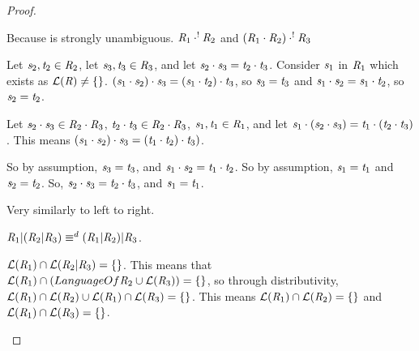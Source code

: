 \documentclass[numbers,10pt,preprint\ifanon ,nocopyrightspace\fi]{sigplanconf}
\begin{document}
\begin{proof}
\begin{case}
    Because \Regex is strongly unambiguous.
    $\mathit{R}_1 \cdot^! \mathit{R}_2$ and
    $(\mathit{R}_1 \cdot \mathit{R}_2) \cdot^! \mathit{R}_3$

    Let $\mathit{s}_2,\mathit{t}_2 \in \mathit{R}_2$, let $\mathit{s}_3,\mathit{t}_3
    \in \mathit{R}_3$, and let
    $\mathit{s}_2 \cdot \mathit{s}_3 = \mathit{t}_2 \cdot \mathit{t}_3$.
    Consider $\mathit{s}_1$ in $\mathit{R}_1$ which exists as
    $\mathcal{L}(\mathit{R}) \neq \{\}$.
    $(\mathit{s}_1 \cdot \mathit{s}_2) \cdot \mathit{s}_3 =
    (\mathit{s}_1 \cdot \mathit{t}_2) \cdot \mathit{t}_3$, so
    $\mathit{s}_3 = \mathit{t}_3$ and
    $\mathit{s}_1 \cdot \mathit{s}_2 = \mathit{s}_1 \cdot \mathit{t}_2$,
    so $\mathit{s}_2 = \mathit{t}_2$.

    Let $\mathit{s}_2 \cdot \mathit{s}_3 \in \mathit{R}_2 \cdot \mathit{R}_3$,
    $\mathit{t}_2 \cdot \mathit{t}_3 \in \mathit{R}_2 \cdot \mathit{R}_3$,
    $\mathit{s}_1,\mathit{t}_1 \in \mathit{R}_1$,
    and let $\mathit{s}_1 \cdot (\mathit{s}_2 \cdot \mathit{s}_3) = 
    \mathit{t}_1 \cdot (\mathit{t}_2 \cdot \mathit{t}_3)$.
    This means $(\mathit{s}_1 \cdot \mathit{s}_2) \cdot \mathit{s}_3 =
    (\mathit{t}_1 \cdot \mathit{t}_2) \cdot \mathit{t}_3)$.
    
    So by assumption, $\mathit{s}_3 = \mathit{t}_3$, and
    $\mathit{s}_1 \cdot \mathit{s}_2 = \mathit{t}_1 \cdot \mathit{t}_2$.
    So by assumption, $\mathit{s}_1 = \mathit{t}_1$ and $\mathit{s}_2 = \mathit{t}_2$.
    So, $\mathit{s}_2 \cdot \mathit{s}_3 = \mathit{t}_2 \cdot \mathit{t}_3$,
    and $\mathit{s}_1 = \mathit{t}_1$.
  \end{case}

  \begin{case}
    Very similarly to left to right.
  \end{case}

  \begin{case}
    $\mathit{R}_1 | (\mathit{R}_2 | \mathit{R}_3) \equiv^d
    (\mathit{R}_1 | \mathit{R}_2) | \mathit{R}_3$.

    $\mathcal{L}(\mathit{R}_1) \cap \mathcal{L}(\mathit{R}_2 | \mathit{R}_3) =
    \{\}$.
    This means that $\mathcal{L}(\mathit{R}_1) \cap
    (LanguageOf{\mathit{R}_2} \cup \mathcal{L}(\mathit{R}_3)) = \{\}$, so through
    distributivity, $\mathcal{L}(\mathit{R}_1) \cap \mathcal{L}(\mathit{R}_2)
    \cup \mathcal{L}(\mathit{R}_1) \cap \mathcal{L}(\mathit{R}_3) = \{\}$.
    This means $\mathcal{L}(\mathit{R}_1) \cap \mathcal{L}(\mathit{R}_2) =
    \{\}$ and
    $\mathcal{L}(\mathit{R}_1) \cap \mathcal{L}(\mathit{R}_3) = \{\}$.


\end{case}
\end{proof}
\end{document}
